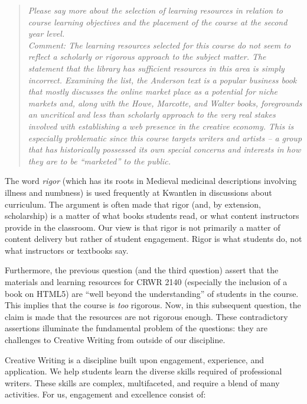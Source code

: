 \documentclass[letterpaper,10pt,headsepline]{scrreprt}
\begin{document}
\begin{quote}
\textit{Please say more about the selection of learning resources in relation to course learning objectives and the placement of the course at the second year level.\\
Comment: The learning resources selected for this course do not seem to reflect a scholarly or rigorous approach to the subject matter. The statement that the library has sufficient resources in this area is simply
incorrect. Examining the list, the Anderson text is a popular business book that mostly discusses the online market place as a potential for niche markets and, along with the Howe, Marcotte, and Walter books, foregrounds
an uncritical and less than scholarly approach to the very real stakes involved with establishing a web presence in the creative economy. This is especially problematic since this course targets writers and artists -- a group that has historically possessed its own special concerns and interests in how they are to be ``marketed'' to the public.}
\end{quote}

The word \textit{rigor} (which has its roots in Medieval medicinal descriptions involving illness and numbness) is used frequently at Kwantlen in discussions about curriculum. The argument is often made that rigor (and, by extension, scholarship) is a matter of what books students read, or what content instructors provide in the classroom. Our view is that rigor is not primarily a matter of content delivery but rather of student engagement. Rigor is what students do, not what instructors or textbooks say.

Furthermore, the previous question (and the third question) assert that the materials and learning resources for CRWR 2140 (especially the inclusion of a book on HTML5) are ``well beyond the understanding'' of students in the course. This implies that the course is \textit{too} rigorous. Now, in this subsequent question, the claim is made that the resources are not rigorous enough. These contradictory assertions illuminate the fundamental problem of the questions: they are challenges to Creative Writing from outside of our discipline.

Creative Writing is a discipline built upon engagement, experience, and application. We help students learn the diverse skills required of professional writers. These skills are complex, multifaceted, and require a blend of many activities. For us, engagement and excellence consist of:
\end{document}
